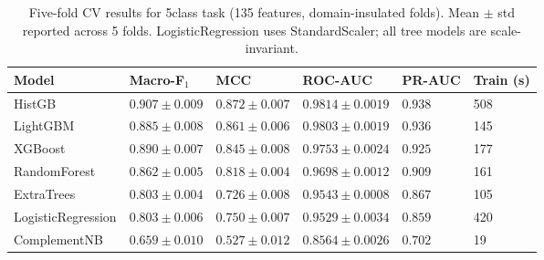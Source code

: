 \begin{table}
\caption{Five-fold CV results for 5class task (135 features, domain-insulated folds). Mean $\pm$ std reported across 5 folds. LogisticRegression uses StandardScaler; all tree models are scale-invariant.}
\label{tab:cv_5class}
\begin{tabular}{llllll}
\toprule
Model & Macro-F$_1$ & MCC & ROC-AUC & PR-AUC & Train (s) \\
\midrule
HistGB & $0.907\pm0.009$ & $0.872\pm0.007$ & $0.9814\pm0.0019$ & $0.938$ & 508 \\
LightGBM & $0.885\pm0.008$ & $0.861\pm0.006$ & $0.9803\pm0.0019$ & $0.936$ & 145 \\
XGBoost & $0.890\pm0.007$ & $0.845\pm0.008$ & $0.9753\pm0.0024$ & $0.925$ & 177 \\
RandomForest & $0.862\pm0.005$ & $0.818\pm0.004$ & $0.9698\pm0.0012$ & $0.909$ & 161 \\
ExtraTrees & $0.803\pm0.004$ & $0.726\pm0.008$ & $0.9543\pm0.0008$ & $0.867$ & 105 \\
LogisticRegression & $0.803\pm0.006$ & $0.750\pm0.007$ & $0.9529\pm0.0034$ & $0.859$ & 420 \\
ComplementNB & $0.659\pm0.010$ & $0.527\pm0.012$ & $0.8564\pm0.0026$ & $0.702$ & 19 \\
\bottomrule
\end{tabular}
\end{table}
